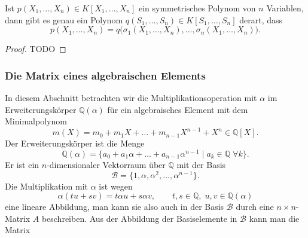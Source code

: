 \begin{satz}
\label{buch:komplex:fundamental:satz:fundamentalpolynom}
Ist $p(X_1,\dots,X_n)\in K[X_1,\dots,X_n]$ ein symmetrisches
Polynom von $n$ Variablen, dann gibt es genau ein Polynom
$q(S_1,\dots,S_n)\in K[S_1,\dots,S_n]$ derart, dass
\[
p(X_1,\dots,X_n)
=
q\bigl(\sigma_1(X_1,\dots,X_n),\dots,\sigma_n(X_1,\dots,X_n)\bigr).
\]
%
\end{satz}

\begin{proof}
TODO
\end{proof}

%
%
\subsubsection{Die Matrix eines algebraischen Elements}
In diesem Abschnitt betrachten wir die Multiplikationsoperation
mit $\alpha$ im Erweiterungskörper $\mathbb{Q}(\alpha)$ für ein
algebraisches Element mit dem Minimalpolynom
\[
m(X)
=
m_0+m_1X+\dots + m_{n-1}X^{n-1}+X^n
\in
\mathbb{Q}[X].
\]
Der Erweiterungskörper ist die Menge
\[
\mathbb{Q}(\alpha)
=
\{
a_0+a_1\alpha+\ldots+a_{n-1}\alpha^{n-1}
\mid
a_k\in\mathbb{Q}\;
\forall k
\}.
\]
Er ist ein $n$-dimensionaler Vektorraum über $\mathbb{Q}$ mit der
Basis
\[
\mathscr{B}
=
\{
1,\alpha,\alpha^2,\ldots,\alpha^{n-1}
\}.
\]
Die Multiplikation mit $\alpha$ ist wegen
\[
\alpha (t u + s v)
=
t
\alpha
u
+
s
\alpha
v
,\qquad t,s\in\mathbb{Q},\;u,v\in\mathbb{Q}(\alpha)
\]
eine lineare Abbildung, man kann sie also auch in der Basis
$\mathscr{B}$ durch eine $n\times n$-Matrix $A$ beschreiben.
Aus der Abbildung der Basiselemente in $\mathscr{B}$ kann
man die Matrix
